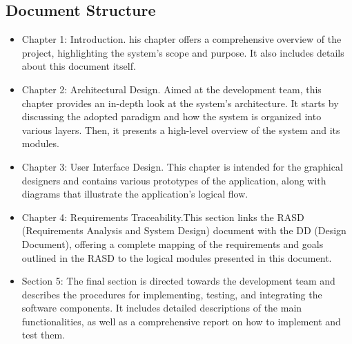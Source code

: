 \subsection{Document Structure}
    \begin{itemize}
        \item Chapter 1: Introduction. his chapter offers a comprehensive overview of the project, highlighting the system's scope and purpose. It also includes details about this document itself.

        \item Chapter 2: Architectural Design.  Aimed at the development team, this chapter provides an in-depth look at the system's architecture. It starts by discussing the adopted paradigm and how the system is organized into various layers. Then, it presents a high-level overview of the system and its modules.

        \item Chapter 3: User Interface Design. This chapter is intended for the graphical designers and contains various prototypes of the application, along with diagrams that illustrate the application's logical flow.

        \item Chapter 4: Requirements Traceability.This section links the RASD (Requirements Analysis and System Design) document with the DD (Design Document), offering a complete mapping of the requirements and goals outlined in the RASD to the logical modules presented in this document.

        \item Section 5: The final section is directed towards the development team and describes the procedures for implementing, testing, and integrating the software components. It includes detailed descriptions of the main functionalities, as well as a comprehensive report on how to implement and test them.
    \end{itemize}


